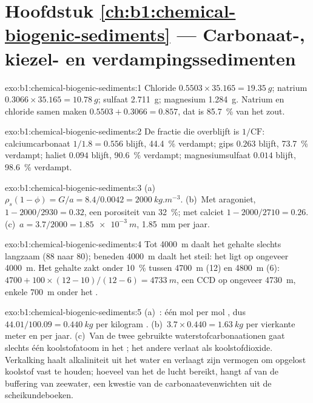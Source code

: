 \section*{Hoofdstuk \ref{ch:b1:chemical-biogenic-sediments} --- Carbonaat-, kiezel- en verdampingssedimenten}

\begin{solution}{exo:b1:chemical-biogenic-sediments:1}
Chloride $0.5503\times35.165 = \qty{19.35}{g}$; natrium $0.3066\times35.165 =
\qty{10.78}{g}$; sulfaat \qty{2.711}{g}; magnesium \qty{1.284}{g}. Natrium en
chloride samen maken $0.5503 + 0.3066 = 0.857$, dat is \qty{85.7}{\%} van het
zout.
\end{solution}

\begin{solution}{exo:b1:chemical-biogenic-sediments:2}
De fractie die overblijft is $1/\mathrm{CF}$: calciumcarbonaat $1/1.8 = 0.556$ blijft,
\qty{44.4}{\%} verdampt; gips $0.263$ blijft, \qty{73.7}{\%} verdampt; haliet $0.094$ blijft,
\qty{90.6}{\%} verdampt; magnesiumsulfaat $0.014$ blijft, \qty{98.6}{\%} verdampt.
\end{solution}

\begin{solution}{exo:b1:chemical-biogenic-sediments:3}
(a)~$\rho_s(1-\phi) = G/a = 8.4/0.0042 = \qty{2000}{kg.m^{-3}}$. (b)~Met
aragoniet, $1 - 2000/2930 = 0.32$, een porositeit van \qty{32}{\%}; met calciet
$1 - 2000/2710 = 0.26$. (c)~$a = 3.7/2000 = \qty{1.85e-3}{m}$, \qty{1.85}{mm} per
jaar.
\end{solution}

\begin{solution}{exo:b1:chemical-biogenic-sediments:4}
Tot \qty{4000}{m} daalt het gehalte slechts langzaam (88 naar 80); beneden
\qty{4000}{m} daalt het steil: het  ligt op ongeveer \qty{4000}{m}. Het
gehalte zakt onder \qty{10}{\%} tussen \qty{4700}{m} (12) en \qty{4800}{m}
(6): $4700 + 100\times(12-10)/(12-6) = \qty{4733}{m}$, een CCD op ongeveer
\qty{4730}{m}, enkele \qty{700}{m} onder het .
\end{solution}

\begin{solution}{exo:b1:chemical-biogenic-sediments:5}
(a)~: één mol  per mol , dus $44.01/100.09 = \qty{0.440}{kg}$  per kilogram . (b)~$3.7\times0.440 = \qty{1.63}{kg}$  per vierkante meter en per jaar. (c)~Van de twee gebruikte waterstofcarbonaationen gaat slechts één koolstofatoom in het ; het andere verlaat als koolstofdioxide. Verkalking haalt alkaliniteit uit het water en verlaagt zijn vermogen om opgelost koolstof vast te houden; hoeveel van het  de lucht bereikt, hangt af van de buffering van zeewater, een kwestie van de carbonaatevenwichten uit de scheikundeboeken.
\end{solution}

